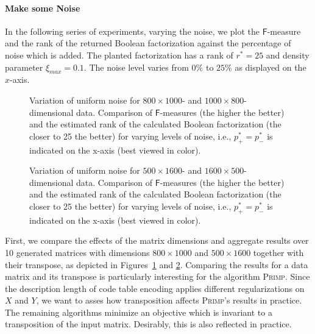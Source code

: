 \paragraph{Make some Noise}
In the following series of experiments, varying the noise, we plot the $\mathsf{F}$-measure and the rank of the returned Boolean factorization against the percentage of noise which is added. The planted factorization has a rank of $r^*=25$ and density parameter $\xi_{max}=0.1$. The noise level varies from $0\%$ to $25\%$ as displayed on the $x$-axis.  
\begin{figure}
\centering

\caption{Variation of uniform noise for $800\times 1000$- and $1000\times 800$-dimensional data. Comparison of $\mathsf{F}$-measures (the higher the better) and the estimated rank of the calculated Boolean factorization (the closer to 25 the better) for varying levels of noise, i.e., $p_+^*=p_-^*$ is indicated on the x-axis (best viewed in color).}
\label{fig:noise810}
\end{figure}
\begin{figure}
\centering

\caption{Variation of uniform noise for $500\times 1600$- and $1600\times 500$-dimensional data. Comparison of $\mathsf{F}$-measures (the higher the better) and the estimated rank of the calculated Boolean factorization (the closer to 25 the better) for varying levels of noise, i.e., $p_+^*=p_-^*$ is indicated on the x-axis (best viewed in color).}
\label{fig:noise516}
\end{figure}

First, we compare the effects of the matrix dimensions and aggregate results over 10 generated matrices with dimensions $800\times 1000$ and $500\times 1600$ together with their transpose, as depicted in Figures~\ref{fig:noise810} and \ref{fig:noise516}. Comparing the results for a data matrix and its transpose is particularly interesting for the algorithm \textsc{Primp}. Since the description length of code table encoding applies different regularizations on $X$ and $Y$, we want to asses how transposition affects \textsc{Primp}'s results in practice. The remaining algorithms minimize an objective which is invariant to a transposition of the input matrix. Desirably, this is also reflected in practice.

